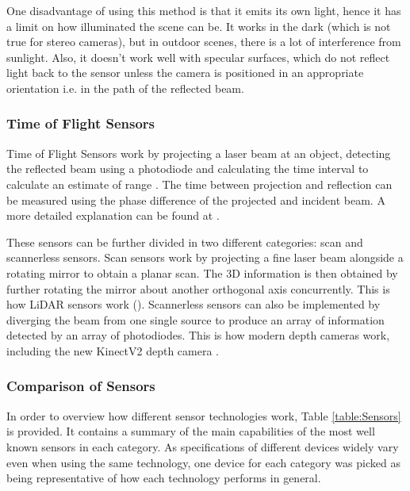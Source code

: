 \documentclass[11pt]{article}
\begin{document}
One disadvantage of using this method is that it emits its own light, hence it has a limit on how illuminated the scene can be. It works in the dark (which is not true for stereo cameras), but in outdoor scenes, there is a lot of interference from sunlight. Also, it doesn't work well with specular surfaces, which do not reflect light back to the sensor unless the camera is positioned in an appropriate orientation i.e. in the path of the reflected beam.
	
	\subsubsection{Time of Flight Sensors}

Time of Flight Sensors work by projecting a laser beam at an object, detecting the reflected beam using a photodiode and calculating the time interval to calculate an estimate of range \cite{horaud2016overview}. The time between projection and reflection can be measured using the phase difference of the projected and incident beam. A more detailed explanation can be found at \cite{horaud2016overview}.

These sensors can be further divided in two different categories: scan and scannerless sensors. Scan sensors work by projecting a fine laser beam alongside a rotating mirror to obtain a planar scan. The 3D information is then obtained by further rotating the mirror about another orthogonal axis concurrently. This is how LiDAR sensors work (\cite{horaud2016overview}). Scannerless sensors can also be implemented by diverging the beam from one single source to produce an array of information detected by an array of photodiodes. This is how modern depth cameras work, including the new KinectV2 depth camera \cite{wasenmuller2016comparison}.

	\subsubsection{Comparison of Sensors}

In order to overview how different sensor technologies work, Table \ref{table:Sensors} is provided. It contains a summary of the main capabilities of the most well known sensors in each category. As specifications of different devices widely vary even when using the same technology, one device for each category was picked as being representative of how each technology performs in general.
\end{document}
